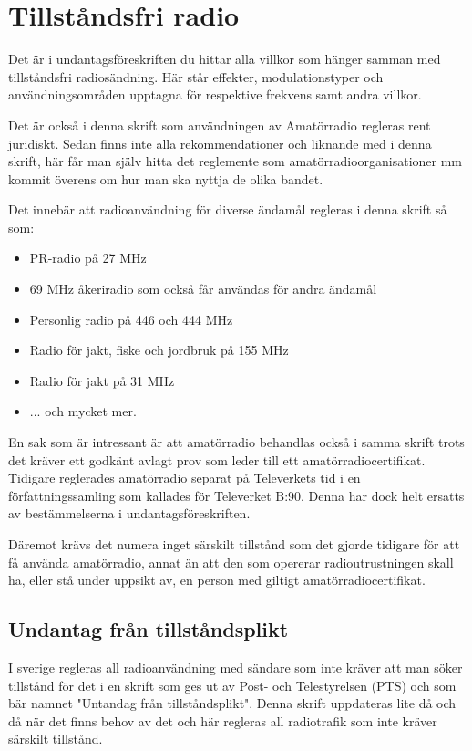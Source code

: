 \section{Tillståndsfri radio}

Det är i undantagsföreskriften du hittar alla villkor som hänger samman med
tillståndsfri radiosändning. Här står effekter, modulationstyper och
användningsområden upptagna för respektive frekvens samt andra villkor.

Det är också i denna skrift som användningen av Amatörradio regleras rent
juridiskt. Sedan finns inte alla rekommendationer och liknande med i denna
skrift, här får man själv hitta det reglemente som amatörradioorganisationer mm
kommit överens om hur man ska nyttja de olika bandet.

Det innebär att radioanvändning för diverse ändamål regleras i denna skrift så
som:

\begin{itemize}
 \item PR-radio på 27 MHz
 \item 69 MHz åkeriradio som också får användas för andra ändamål
 \item Personlig radio på 446 och 444 MHz
 \item Radio för jakt, fiske och jordbruk på 155 MHz
 \item Radio för jakt på 31 MHz
 \item ... och mycket mer.
\end{itemize}

En sak som är intressant är att amatörradio behandlas också i samma skrift trots
det kräver ett godkänt avlagt prov som leder till ett amatörradiocertifikat.
Tidigare reglerades amatörradio separat på Televerkets tid i en
författningssamling som kallades för Televerket B:90. Denna har dock helt
ersatts av bestämmelserna i undantagsföreskriften.

Däremot krävs det numera inget särskilt tillstånd som det gjorde tidigare för
att få använda amatörradio, annat än att den som opererar radioutrustningen
skall ha, eller stå under uppsikt av, en person med giltigt
amatörradiocertifikat.

\subsection{Undantag från tillståndsplikt}

I sverige regleras all radioanvändning med sändare som inte kräver att man söker
tillstånd för det i en skrift som ges ut av Post- och Telestyrelsen (PTS) och
som bär namnet "Untandag från tillståndsplikt". Denna skrift uppdateras lite då
och då när det finns behov av det och här regleras all radiotrafik som inte
kräver särskilt tillstånd.

